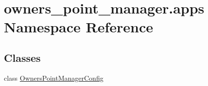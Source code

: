 \hypertarget{namespaceowners__point__manager_1_1apps}{\section{owners\-\_\-point\-\_\-manager.\-apps Namespace Reference}
\label{namespaceowners__point__manager_1_1apps}
}
\subsection*{Classes}
\begin{DoxyCompactItemize}
\item 
class \hyperlink{classowners__point__manager_1_1apps_1_1OwnersPointManagerConfig}{Owners\-Point\-Manager\-Config}
\end{DoxyCompactItemize}
